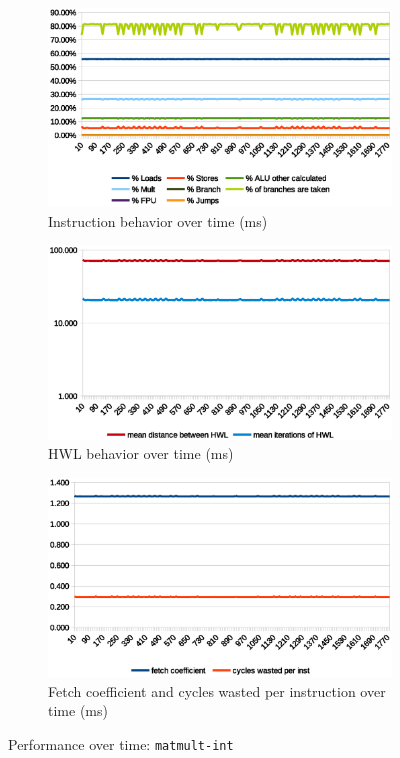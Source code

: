 \documentclass[../bachelor_paper.tex]{subfiles}
\begin{document}
\begin{figure}
    \begin{subfigure}{0.45\textwidth}
        \includegraphics[width=\textwidth]{img/graph/embench/matmult-int_inst.eps}
        \caption{Instruction behavior over time (ms)}
    \end{subfigure}
    \begin{subfigure}{0.45\textwidth}
        \includegraphics[width=\textwidth]{img/graph/embench/matmult-int_hwl.eps}
        \caption{\ac{HWL} behavior over time (ms)}
    \end{subfigure}
    \begin{subfigure}{0.45\textwidth}
        \includegraphics[width=\textwidth]{img/graph/embench/matmult-int_fetch_waste.eps}
        \caption{Fetch coefficient and cycles wasted per instruction over time (ms)}
    \end{subfigure}
    \caption{Performance over time: \texttt{matmult-int}}
\end{figure}
\end{document}
